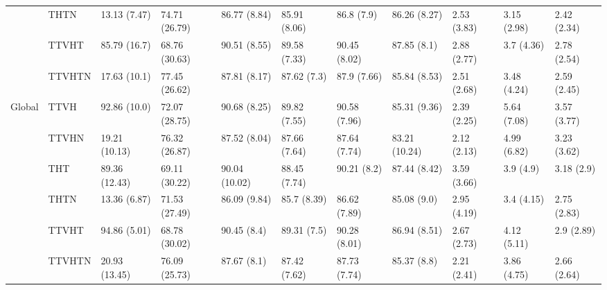 \begin{table}
\begin{tabular}{lllllllllll}
       & THTN &   13.13 (7.47) &  74.71 (26.79) &   86.77 (8.84) &  85.91 (8.06) &    86.8 (7.9) &   86.26 (8.27) &      2.53 (3.83) &  3.15 (2.98) &  2.42 (2.34) \\
       & TTVHT &   85.79 (16.7) &  68.76 (30.63) &   90.51 (8.55) &  89.58 (7.33) &  90.45 (8.02) &    87.85 (8.1) &      2.88 (2.77) &   3.7 (4.36) &  2.78 (2.54) \\
       & TTVHTN &   17.63 (10.1) &  77.45 (26.62) &   87.81 (8.17) &   87.62 (7.3) &   87.9 (7.66) &   85.84 (8.53) &      2.51 (2.68) &  3.48 (4.24) &  2.59 (2.45) \\
Global & TTVH &   92.86 (10.0) &  72.07 (28.75) &   90.68 (8.25) &  89.82 (7.55) &  90.58 (7.96) &   85.31 (9.36) &      2.39 (2.25) &  5.64 (7.08) &  3.57 (3.77) \\
       & TTVHN &  19.21 (10.13) &  76.32 (26.87) &   87.52 (8.04) &  87.66 (7.64) &  87.64 (7.74) &  83.21 (10.24) &      2.12 (2.13) &  4.99 (6.82) &  3.23 (3.62) \\
       & THT &  89.36 (12.43) &  69.11 (30.22) &  90.04 (10.02) &  88.45 (7.74) &   90.21 (8.2) &   87.44 (8.42) &      3.59 (3.66) &    3.9 (4.9) &   3.18 (2.9) \\
       & THTN &   13.36 (6.87) &  71.53 (27.49) &   86.09 (9.84) &   85.7 (8.39) &  86.62 (7.89) &    85.08 (9.0) &      2.95 (4.19) &   3.4 (4.15) &  2.75 (2.83) \\
       & TTVHT &   94.86 (5.01) &  68.78 (30.02) &    90.45 (8.4) &   89.31 (7.5) &  90.28 (8.01) &   86.94 (8.51) &      2.67 (2.73) &  4.12 (5.11) &   2.9 (2.89) \\
       & TTVHTN &  20.93 (13.45) &  76.09 (25.73) &    87.67 (8.1) &  87.42 (7.62) &  87.73 (7.74) &    85.37 (8.8) &      2.21 (2.41) &  3.86 (4.75) &  2.66 (2.64) \\
\bottomrule
\end{tabular}
\end{table}
